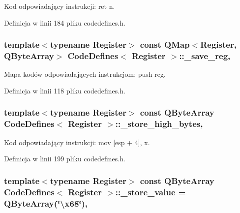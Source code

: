 Kod odpowiadający instrukcji\-: ret n. 



Definicja w linii 184 pliku codedefines.\-h.

\hypertarget{class_code_defines_a7adc87b5303b856416d50e6c2cad8b6d}{
\subsubsection[{\-\_\-save\-\_\-reg}]{\setlength{\rightskip}{0pt plus 5cm}template$<$typename Register$>$ const Q\-Map$<$Register, Q\-Byte\-Array$>$ {\bf Code\-Defines}$<$ Register $>$\-::\-\_\-save\-\_\-reg\hspace{0.3cm}{\ttfamily [static]}, {\ttfamily [private]}}}\label{class_code_defines_a7adc87b5303b856416d50e6c2cad8b6d}


Mapa kodów odpowiadających instrukcjom\-: push reg. 



Definicja w linii 118 pliku codedefines.\-h.

\hypertarget{class_code_defines_ad8225e99b66893881d578968d457f9dd}{
\subsubsection[{\-\_\-store\-\_\-high\-\_\-bytes}]{\setlength{\rightskip}{0pt plus 5cm}template$<$typename Register$>$ const Q\-Byte\-Array {\bf Code\-Defines}$<$ Register $>$\-::\-\_\-store\-\_\-high\-\_\-bytes\hspace{0.3cm}{\ttfamily [static]}, {\ttfamily [private]}}}\label{class_code_defines_ad8225e99b66893881d578968d457f9dd}


Kod odpowiadający instrukcji\-: mov \mbox{[}esp + 4\mbox{]}, x. 



Definicja w linii 199 pliku codedefines.\-h.

\hypertarget{class_code_defines_accd429ecdb9272f239e6c3057dfc46c6}{
\subsubsection[{\-\_\-store\-\_\-value}]{\setlength{\rightskip}{0pt plus 5cm}template$<$typename Register$>$ const Q\-Byte\-Array {\bf Code\-Defines}$<$ Register $>$\-::\-\_\-store\-\_\-value = Q\-Byte\-Array(\char`\"{}\textbackslash{}x68\char`\"{})\hspace{0.3cm}{\ttfamily [static]}, {\ttfamily [private]}}}\label{class_code_defines_accd429ecdb9272f239e6c3057dfc46c6}


